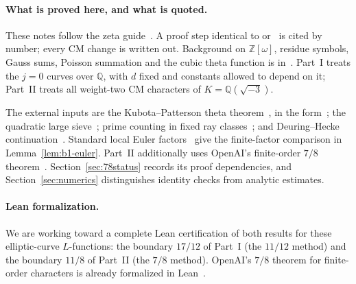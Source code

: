\documentclass[11pt]{article}
\numberwithin{equation}{section}
\newcommand{\OO}{\mathbb Z[\omega]}
\begin{document}
\paragraph{What is proved here, and what is quoted.}
These notes follow the zeta guide~\cite{ZG}. A proof step identical to
\cite{OAI1112} or~\cite{OAI78} is cited by number; every CM change
is written out. Background on $\OO$, residue symbols, Gauss sums, Poisson summation
and the cubic theta function is in~\cite{QF}. Part~I treats the $j=0$ curves over
$\mathbb Q$, with $d$ fixed and constants allowed to depend on it; Part~II treats
all weight-two CM characters of $K=\mathbb Q(\sqrt{-3})$.

The external inputs are the Kubota--Patterson theta theorem~\cite{Kub69,Pat77},
in the form~\cite[Theorem~23]{QF}; the quadratic large sieve~\cite{HB95,GL}; prime
counting in fixed ray classes~\cite{Lan03,Hec17,Hec20}; and Deuring--Hecke
continuation~\cite{Deuring,Hec20}. Standard local Euler factors~\cite{SilAEC}
give the finite-factor comparison in Lemma~\ref{lem:b1-euler}.
Part~II additionally uses OpenAI's finite-order $7/8$ theorem~\cite{OAI78}.
Section~\ref{sec:78status} records its proof dependencies, and
Section~\ref{sec:numerics} distinguishes identity checks from analytic estimates.

\paragraph{Lean formalization.} We are working toward a complete Lean certification of both results for these
elliptic-curve $L$-functions: the boundary $17/12$ of Part~I (the $11/12$ method) and the boundary $11/8$ of
Part~II (the $7/8$ method). OpenAI's $7/8$ theorem for finite-order characters is already formalized
in Lean~\cite{OAIlean}.
\end{document}
